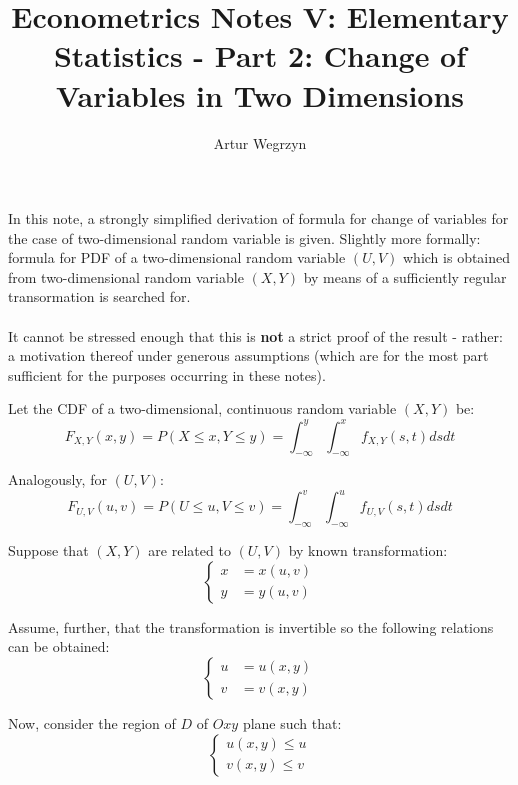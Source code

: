 \documentclass[12pt]{article}
\begin{document}
\title{Econometrics Notes V: Elementary Statistics - Part 2: Change of Variables in Two Dimensions}
\author{Artur Wegrzyn}
\maketitle

In this note, a strongly simplified derivation of formula for change of variables for the case of two-dimensional random variable is given.
Slightly more formally: formula for PDF of a two-dimensional random variable $(U, V)$ which is obtained from two-dimensional random variable 
$(X, Y)$ by means of a sufficiently regular transormation is searched for. \\
\\ \indent It cannot be stressed enough that this is \textbf{not} a strict proof of the result - rather: a motivation thereof under generous assumptions (which are for the most part sufficient for the purposes occurring in these notes).

Let the CDF of a two-dimensional, continuous random variable $(X, Y)$ be:
\begin{equation*}
F_{X, Y}(x, y) = P(X \leq x, Y \leq y) = 
\int_{-\infty}^{y} \int_{-\infty}^{x} f_{X, Y}(s, t) ds dt 
\end{equation*}

Analogously, for $(U, V)$:
\begin{equation*}
F_{U, V}(u, v) = P(U \leq u, V \leq v) = 
\int_{-\infty}^{v} \int_{-\infty}^{u} f_{U, V}(s, t) ds dt
\end{equation*}


Suppose that $(X, Y)$ are related to $(U, V)$ by known transformation:
\begin{equation*}
\left\{
\begin{aligned}
x &= x(u, v) \\ 
y &= y(u, v)
\end{aligned}
\right.
\end{equation*}


Assume, further, that the transformation is invertible so the following relations can be obtained:
\begin{equation*}
\left\{
\begin{aligned}
u &= u(x, y) \\
v &= v(x, y)
\end{aligned}
\right.
\end{equation*}

Now, consider the region of $D$ of $Oxy$ plane such that:
\begin{equation*}
\left\{
\begin{aligned}
u(x, y) \leq u \\
v(x, y) \leq v
\end{aligned}
\right.
\end{equation*} 
\end{document}
